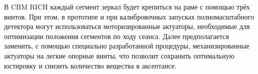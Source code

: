 





В CBM RICH каждый сегмент зеркал будет крепиться на раме с помощью трёх винтов. При этом, в прототипе и при калибровочных запусках полномасштабного детектора могут использоваться моторизированные актуаторы, необходимые для оптимизации положения сегментов по ходу сеанса. Далее предполагается заменить, с помощью специально разработанной процедуры, механизированные актуаторы на легкие опорные винты, что позволит сохранить оптимальную юстировку и снизить количество вещества в аксептансе.

